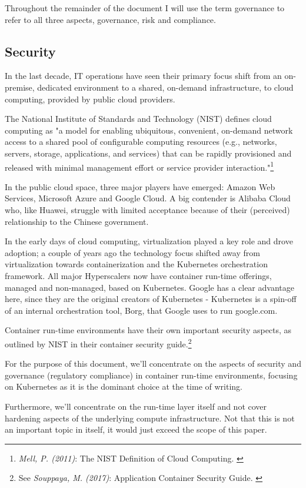 Throughout the remainder of the document I will use the term governance to refer to all three aspects, governance, risk and compliance.

\subsection{Security}

In the last decade, IT operations have seen their primary focus shift from an on-premise, dedicated environment to a shared, on-demand infrastructure, to cloud computing, provided by public cloud providers.

The National Institute of Standards and Technology (NIST) defines cloud computing as "a model for enabling ubiquitous, convenient, on-demand network access to a shared pool of configurable computing resources (e.g., networks, servers, storage, applications, and services) that can be rapidly provisioned and released with minimal management effort or service provider interaction."\footnote{\textit{Mell, P. (2011)}: The NIST Definition of Cloud Computing. \cite{sp800-145}}

In the public cloud space, three major players have emerged: Amazon Web Services, Microsoft Azure and Google Cloud. A big contender is Alibaba Cloud who, like Huawei, struggle with limited acceptance because of their (perceived) relationship to the Chinese government.

In the early days of cloud computing, virtualization played a key role and drove adoption; a couple of years ago the technology focus shifted away from virtualization towards containerization and the Kubernetes orchestration framework. All major Hyperscalers now have container run-time offerings, managed and non-managed, based on Kubernetes. Google has a clear advantage here, since they are the original creators of Kubernetes - Kubernetes is a spin-off of an internal orchestration tool, Borg, that Google uses to run google.com.

Container run-time environments have their own important security aspects, as outlined by NIST in their container security guide.\footnote{See \textit{Souppaya, M. (2017)}: Application Container Security Guide. \cite{sp800-190}}

For the purpose of this document, we'll concentrate on the aspects of security and governance (regulatory compliance) in container run-time environments, focusing on Kubernetes as it is the dominant choice at the time of writing.

Furthermore, we'll concentrate on the run-time layer itself and not cover hardening aspects of the underlying compute infrastructure. Not that this is not an important topic in itself, it would just exceed the scope of this paper.
